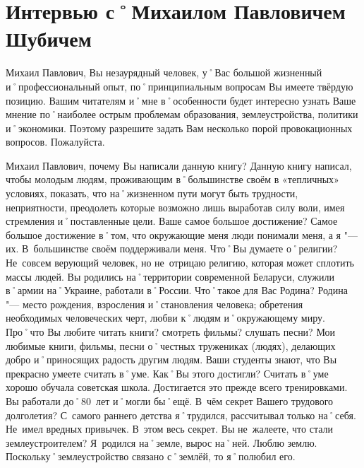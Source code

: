 ﻿\chapter[Интервью с М.\,П.~Шубичем]{Интервью с˚Михаилом Павловичем Шубичем}

\begin{drama}
	\setlength{\speaksindent}{5em}
	\setlength{\Dlabelsep}{5em}
	
	\maxspeaks Михаил Павлович, Вы незаурядный человек, у˚Вас большой жизненный и˚профессиональный опыт, по˚принципиальным вопросам Вы имеете твёрдую позицию. Вашим читателям и˚мне в˚особенности будет интересно узнать Ваше мнение по˚наиболее острым проблемам образования, землеустройства, политики и˚экономики. Поэтому разрешите задать Вам несколько порой провокационных вопросов.
	\michaelspeaks Пожалуйста.
	
	\maxspeaks Михаил Павлович, почему Вы написали данную книгу?
	\michaelspeaks Данную книгу написал, чтобы молодым людям, проживающим в˚большинстве своём в «тепличных» условиях, показать, что на˚жизненном пути могут быть трудности, неприятности, преодолеть которые возможно лишь выработав силу воли, имея стремления и˚поставленные цели.
	\maxspeaks Ваше самое большое достижение?
	\michaelspeaks Самое большое достижение в˚том, что окружающие меня люди понимали меня, а я "--- их. В~большинстве своём поддерживали меня.
	\maxspeaks Что˚Вы думаете о˚религии? 
	\michaelspeaks Не~совсем верующий человек, но не~отрицаю религию, которая может сплотить массы людей.
	\maxspeaks Вы родились на˚территории современной Беларуси, служили в˚армии на˚Украине, работали в˚России. Что˚такое для Вас Родина?
	\michaelspeaks Родина "--- место рождения, взросления и˚становления человека; обретения необходимых человеческих черт, любви к˚людям и˚окружающему миру.
	\maxspeaks Про˚что Вы любите читать книги? смотреть фильмы? слушать песни?
	\michaelspeaks Мои любимые книги, фильмы, песни о˚честных тружениках (людях), делающих добро и˚приносящих радость другим людям.
	\maxspeaks Ваши студенты знают, что Вы прекрасно умеете считать в˚уме. Как˚Вы этого достигли?
	\michaelspeaks Считать в˚уме хорошо обучала советская школа. Достигается это прежде всего тренировками.
	\maxspeaks Вы работали до˚80~лет и˚могли бы˚ещё. В~чём секрет Вашего трудового долголетия?
	\michaelspeaks С~самого раннего детства я˚трудился, рассчитывал только на˚себя. Не~имел вредных привычек. В~этом весь секрет. 
	\maxspeaks Вы не~жалеете, что стали землеустроителем?
	\michaelspeaks Я~родился на˚земле, вырос на˚ней. Люблю землю. Поскольку˚землеустройство связано с˚землёй, то я˚полюбил его.


\end{drama}
